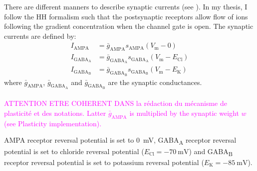 There are different manners to describe synaptic currents (see \citep{destexhe_circuit_2004}). In my thesis, I follow the \acrshort{HH} formalism such that the postsynaptic receptors allow flow of ions following the gradient concentration when the channel gate is open. The synaptic currents are defined by:
\begin{align*}
    I_{\mathrm{AMPA}}	&  = \bar{g}_{\mathrm{AMPA}} s_\mathrm{AMPA}(V_\mathrm{m} - 0) \\
    I_{\mathrm{GABA}_\mathrm{A}} &  = \bar{g}_{\mathrm{GABA}_\mathrm{A}}  s_{\mathrm{GABA}_\mathrm{A}} (V_\mathrm{m}-E_\mathrm{Cl})\\
    I_{\mathrm{GABA}_\mathrm{B}}   &= \bar{g}_{\mathrm{GABA}_\mathrm{B}} s_{\mathrm{GABA}_\mathrm{B}} (V_\mathrm{m}-E_\mathrm{K})
\end{align*}
where $\bar{g}_{\mathrm{AMPA}}$,  $\bar{g}_{\mathrm{GABA}_\mathrm{A}}$ and $\bar{g}_{\mathrm{GABA}_\mathrm{B}}$ are the synaptic conductances. \\
~\\
\textcolor{magenta}{ATTENTION ETRE COHERENT DANS la rédaction du mécanisme de plasticité et des notations. Latter $\bar{g}_{\mathrm{AMPA}}$ is multiplied by the synaptic weight $w$ (see Plasticity implementation).}


AMPA receptor reversal potential is set to \SI{0}{\milli\volt}, GABA\textsubscript{A} receptor reversal potential is set to chloride reversal potential ($E_\mathrm{Cl} = \SI{-70}{\milli\volt}$) and GABA\textsubscript{B}  receptor reversal potential is set to potassium reversal potential ($E_\mathrm{K} = \SI{-85}{\milli\volt}$).

